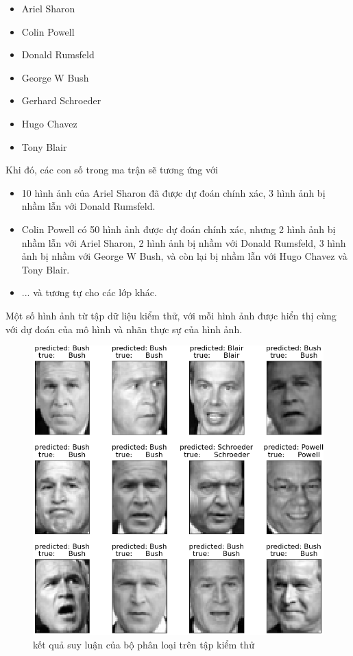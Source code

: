 \documentclass[12pt,a4paper,oneside]{report}
\numberwithin{equation}{section}
\begin{document}
\begin{itemize}
	\item Ariel Sharon
	\item Colin Powell
	\item Donald Rumsfeld
	\item George W Bush
	\item Gerhard Schroeder
	\item Hugo Chavez
	\item Tony Blair
\end{itemize}
Khi đó, các con số trong ma trận sẽ tương ứng với

\begin{itemize}
	\item 10 hình ảnh của Ariel Sharon đã được dự đoán chính xác, 3 hình ảnh bị nhầm lẫn với Donald Rumsfeld.
	\item Colin Powell có 50 hình ảnh được dự đoán chính xác, nhưng 2 hình ảnh bị nhầm lẫn với Ariel Sharon, 2 hình ảnh bị nhầm với Donald Rumsfeld, 3 hình ảnh bị nhầm với George W Bush, và còn lại bị nhầm lẫn với Hugo Chavez và Tony Blair.
	\item ... và tương tự cho các lớp khác.
\end{itemize}
Một số hình ảnh từ tập dữ liệu kiểm thử, với mỗi hình ảnh được hiển thị cùng với dự đoán của mô hình và nhãn thực sự của hình ảnh.

\begin{figure}[htp]
	\centering
	\includegraphics[scale=0.8]{predict_pca.png}
	\caption{kết quả suy luận của bộ phân loại trên tập kiểm thử}
	\label{fig:output}
\end{figure}
\newpage
\end{document}
